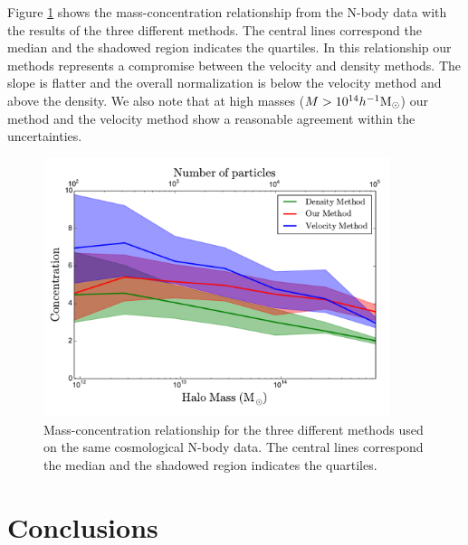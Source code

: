 \documentclass[useAMS,usenatbib]{mn2e}
\newcommand{\hMsun}{{\ifmmode{h^{-1}{\rm
        {M_{\odot}}}}\else{$h^{-1}{\rm{M_{\odot}}}$~}\fi}}
\begin{document}
Figure \ref{fig:concentration} shows the mass-concentration
relationship from the N-body data with the results of the three
different methods.
The central lines correspond the median and the
shadowed region indicates the quartiles.
In this relationship our methods represents a compromise between the
velocity and density methods.
The slope is flatter and the overall normalization is below the
velocity method and above the density.
We also note that at high masses ($M>10^{14}\hMsun$) our method 
and the velocity method show a reasonable agreement within the
uncertainties. 
 



\begin{figure}
\begin{center}
  \includegraphics[width=0.90\textwidth]{concentration.pdf}
\end{center}
\caption{Mass-concentration relationship for the three different
  methods used on the same cosmological N-body data. The central lines
  correspond the median and the shadowed region indicates the
  quartiles.
    \label{fig:concentration}}
\end{figure}




\section{Conclusions}
\label{sec:conclusions}




\end{document}
